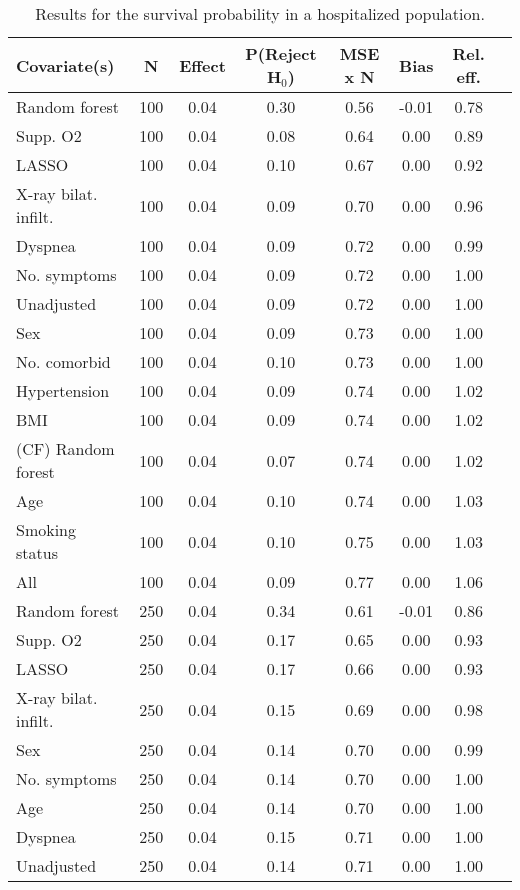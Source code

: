 \documentclass{article}
\begin{document}
{\tabcolsep=6pt  %
\begin{longtable}{lccccccc}
\caption{Results for the survival probability in a hospitalized population.} \\
Covariate(s) & N & Effect & P(Reject H$_0$) & MSE x N & Bias & Rel. eff.\\ \midrule
Random forest & 100 & 0.04 & 0.30 & 0.56 & -0.01 & 0.78 \\ 
Supp. O2 & 100 & 0.04 & 0.08 & 0.64 &  0.00 & 0.89 \\ 
LASSO & 100 & 0.04 & 0.10 & 0.67 &  0.00 & 0.92 \\ 
X-ray bilat. infilt. & 100 & 0.04 & 0.09 & 0.70 &  0.00 & 0.96 \\ 
Dyspnea & 100 & 0.04 & 0.09 & 0.72 &  0.00 & 0.99 \\ 
No. symptoms & 100 & 0.04 & 0.09 & 0.72 &  0.00 & 1.00 \\ 
Unadjusted & 100 & 0.04 & 0.09 & 0.72 &  0.00 & 1.00 \\ 
Sex & 100 & 0.04 & 0.09 & 0.73 &  0.00 & 1.00 \\ 
No. comorbid & 100 & 0.04 & 0.10 & 0.73 &  0.00 & 1.00 \\ 
Hypertension & 100 & 0.04 & 0.09 & 0.74 &  0.00 & 1.02 \\ 
BMI & 100 & 0.04 & 0.09 & 0.74 &  0.00 & 1.02 \\ 
(CF) Random forest & 100 & 0.04 & 0.07 & 0.74 &  0.00 & 1.02 \\ 
Age & 100 & 0.04 & 0.10 & 0.74 &  0.00 & 1.03 \\ 
Smoking status & 100 & 0.04 & 0.10 & 0.75 &  0.00 & 1.03 \\ 
All & 100 & 0.04 & 0.09 & 0.77 &  0.00 & 1.06 \\ \midrule() 
Random forest & 250 & 0.04 & 0.34 & 0.61 & -0.01 & 0.86 \\ 
Supp. O2 & 250 & 0.04 & 0.17 & 0.65 &  0.00 & 0.93 \\ 
LASSO & 250 & 0.04 & 0.17 & 0.66 &  0.00 & 0.93 \\ 
X-ray bilat. infilt. & 250 & 0.04 & 0.15 & 0.69 &  0.00 & 0.98 \\ 
Sex & 250 & 0.04 & 0.14 & 0.70 &  0.00 & 0.99 \\ 
No. symptoms & 250 & 0.04 & 0.14 & 0.70 &  0.00 & 1.00 \\ 
Age & 250 & 0.04 & 0.14 & 0.70 &  0.00 & 1.00 \\ 
Dyspnea & 250 & 0.04 & 0.15 & 0.71 &  0.00 & 1.00 \\ 
Unadjusted & 250 & 0.04 & 0.14 & 0.71 &  0.00 & 1.00 \\ 

\end{longtable}}
\end{document}
